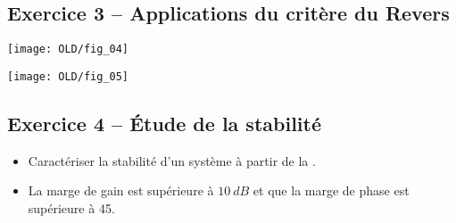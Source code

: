 \subsection*{Exercice 3 -- Applications du critère du Revers}
\setcounter{question}{0}



%
%
%
\ifprof
\else

\begin{multicols}{2}
\begin{center}
\texttt{[image: OLD/fig\_04]}
\end{center}

\begin{center}
\texttt{[image: OLD/fig\_05]}
\end{center}
\end{multicols}
\fi



\subsection*{Exercice 4 -- Étude de la stabilité}
\setcounter{question}{0}

\ifprof
\else

\begin{obj}
\begin{itemize}
\item Caractériser la stabilité d'un système à partir de la {}.
\item La marge de gain est supérieure à $\SI{10}{dB}$ et que la marge de phase est supérieure à \SI{45}{\degres}.
\end{itemize}

\end{obj}


